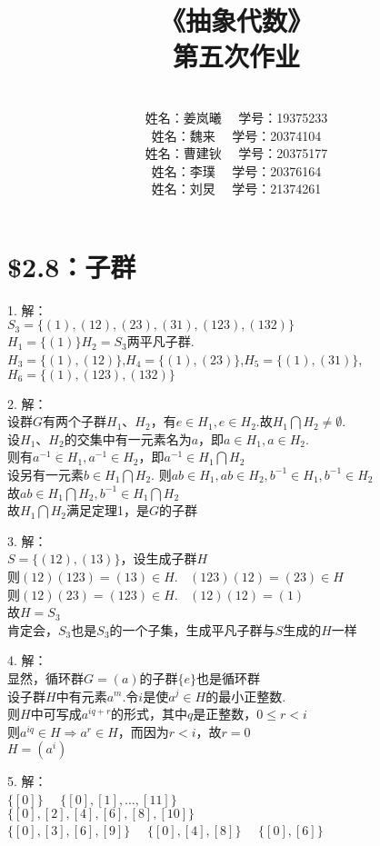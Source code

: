 \documentclass{ctexart}
\title{《抽象代数》\\ 第五次作业}
\author{\\姓名：姜岚曦 \ \ 学号：19375233
		\\姓名：魏来   \ \ 学号：20374104         
	    \\姓名：曹建钬 \ \ 学号：20375177
        \\姓名：李璞   \ \ 学号：20376164
        \\姓名：刘炅   \ \ 学号：21374261}
\date{}
\begin{document}
\pagestyle{empty}
\thispagestyle{empty}
\maketitle
\clearpage	
	
\section*{\$2.8：子群}
1.
解：\\
$S_3=\{(1),(12),(23),(31),(123),(132)\}$\\
$H_1=\{(1)\} H_2=S_3$两平凡子群.\\
$H_3=\{(1),(12)\}$,$H_4=\{(1),(23)\}$,$H_5=\{(1),(31)\}$,$H_6=\{(1),(123),(132)\}$

2.
解：\\
设群$G$有两个子群$H_1$、$H_2$，有$e\in H_1,e \in H_2$.故$H_1 \bigcap H_2 \neq \emptyset $.\\
设$H_1$、$H_2$的交集中有一元素名为$a$，即$a \in H_1,a \in H_2$.\\ 
则有$a^{-1} \in H_1, a^{-1} \in H_2$，即$a^{-1} \in H_1 \bigcap H_2$\\
设另有一元素$b \in H_1 \bigcap H_2$. 则$ab \in H_1, ab \in H_2, b^{-1} \in H_1, b^{-1} \in H_2$ \\
故$ab \in H_1 \bigcap H_2, b^{-1} \in H_1 \bigcap H_2$\\
故$ H_1 \bigcap H_2$满足定理1，是$G$的子群

3.
解：\\
$S=\{(12),(13)\}$，设生成子群$H$ \\
则$(12)(123)=(13) \in H. \ \ \ \ (123)(12)=(23) \in H$\\
则$(12)(23)=(123) \in H. \ \ \ \ (12)(12)=(1)$\\
故$H=S_3$\\
肯定会，$S_3$也是$S_3$的一个子集，生成平凡子群与$S$生成的$H$一样

4.
解：\\
显然，循环群$G=(a)$的子群$\{e\}$也是循环群\\
设子群$H$中有元素$a^m$.令$i$是使$a^j \in H$的最小正整数. \\
则$H$中可写成$a^{iq+r}$的形式，其中$q$是正整数，$0 \leq r < i$\\
则$a^{iq} \in H \Rightarrow a^r \in H$，而因为$r<i$，故$r=0$ \\
$H=(a^i)$

5.
解：\\
$\{[0]\}$ \ \ $\{[0],[1],\ldots,[11]\}$ \\
$\{[0],[2],[4],[6],[8],[10]\}$\\
$\{[0],[3],[6],[9]\}$ \ \ $\{[0],[4],[8]\}$ \ \ $\{[0],[6]\}$
\end{document}
